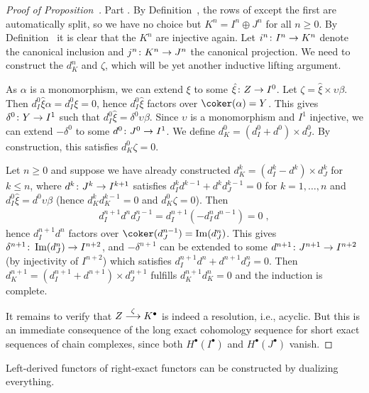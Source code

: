 \documentclass[a4paper,parskip=half,numbers=enddot, DIV=12]{scrreprt}
\begin{document}
\begin{proof}[Proof of Proposition~]
	Part . By Definition~, the rows of  except the first are automatically split, so we have no choice but $K^n=I^n\oplus J^n$ for all $n\geq 0$. By Definition~ it is clear that the $K^n$ are injective again. Let $i^n\colon I^n\morphism K^n$ denote the canonical inclusion and $j^n\colon K^n\morphism J^n$ the canonical projection. We need to construct the $d_{K }^n$ and $\zeta$, which will be yet another inductive lifting argument.
	 
	 As $\alpha$ is a monomorphism, we can extend $\xi$ to some $\hat{\xi}\colon Z\morphism I^0$. Let $\zeta=\hat{\xi}\times \upsilon\beta$. Then $d_{I }^0\hat{\xi}\alpha=d_{I }^0\xi=0$, hence $d_{I }^0\hat{\xi}$ factors over $\coker(\alpha)=Y$. This gives $\delta^0\colon Y\morphism I^1$ such that $d_{I }^0\hat{\xi}=\delta^0\upsilon\beta$. Since $\upsilon$ is a monomorphism and $I^1$ injective, we can extend $-\delta^0$ to some $d^0\colon J^0\morphism I^1$. We define $d_{K }^0=(d_{I }^0+d^0)\times d_{J }^0$. By construction, this satisfies $d_{K }^0\zeta=0$.
	 
	 Let $n\geq 0$ and suppose we have already constructed $d_{K }^k=(d_{I }^k-d^k)\times d_{J }^k$ for $k\leq n$, where $d^k\colon J^k\morphism I^{k+1}$ satisfies $d_{I }^kd^{k-1}+d^kd_{J }^{k-1}=0$ for $k=1,\ldots,n$ and $d_{I }^0\hat{\xi}=d^0\upsilon\beta$ (hence $d_{K }^kd_{K }^{k-1}=0$ and $d_{K }^0\zeta=0$). Then
	 \begin{align*}
	 	d_{I }^{n+1}d^nd_{J }^{n-1}=d_{I }^{n+1}\left(-d_{I }^nd^{n-1}\right)=0\;,
	 \end{align*}
	 hence $d_{I }^{n+1}d^n$ factors over $\coker(d_{J }^{n-1})=\Im(d_{J }^n)$. This gives $\delta^{n+1}\colon \Im(d_{J }^n)\morphism I^{n+2}$, and $-\delta^{n+1}$ can be extended to some $d^{n+1}\colon J^{n+1}\morphism I^{n+2}$ (by injectivity of $I^{n+2}$) which satisfies $d_{I }^{n+1}d^{n}+d^{n+1}d_{J }^n=0$. Then $d_{K }^{n+1}=(d_{I }^{n+1}+d^{n+1})\times d_{J }^{n+1}$ fulfills $d_{K }^{n+1}d_{K }^n=0$ and the induction is complete.
	
	 It remains to verify that $Z\morphism[\zeta]K^\bullet $ is indeed a resolution, i.e., acyclic. But this is an immediate consequence of the long exact cohomology sequence for short exact sequences of chain complexes, since both $H^\bullet (I^\bullet )$ and $H^\bullet (J^\bullet )$ vanish.
\end{proof}
Left-derived functors of right-exact functors can be constructed by dualizing everything.
\end{document}
